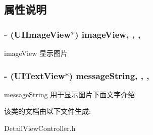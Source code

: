 \subsection{属性说明}
\hypertarget{interface_detail_view_controller_abbfe3bd7006a8d1bc65ab912baba010c}{
\subsubsection[{image\-View}]{\setlength{\rightskip}{0pt plus 5cm}-\/ (U\-I\-Image\-View$\ast$) image\-View\hspace{0.3cm}{\ttfamily [read]}, {\ttfamily [write]}, {\ttfamily [nonatomic]}, {\ttfamily [retain]}}}\label{interface_detail_view_controller_abbfe3bd7006a8d1bc65ab912baba010c}
image\-View 显示图片 \hypertarget{interface_detail_view_controller_a3dc13cf075c44441185fc0f91e363607}{
\subsubsection[{message\-String}]{\setlength{\rightskip}{0pt plus 5cm}-\/ (U\-I\-Text\-View$\ast$) message\-String\hspace{0.3cm}{\ttfamily [read]}, {\ttfamily [write]}, {\ttfamily [nonatomic]}, {\ttfamily [retain]}}}\label{interface_detail_view_controller_a3dc13cf075c44441185fc0f91e363607}
message\-String 用于显示图片下面文字介绍 

该类的文档由以下文件生成\-:\begin{DoxyCompactItemize}
\item 
Detail\-View\-Controller.\-h\end{DoxyCompactItemize}
